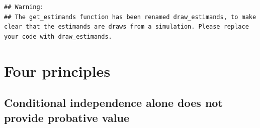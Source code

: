 \documentclass[12pt,]{book}
\newenvironment{Shaded}{\begin{snugshade}}{\end{snugshade}}
\newcommand{\DataTypeTok}[1]{\textcolor[rgb]{0.13,0.29,0.53}{#1}}
\newcommand{\DecValTok}[1]{\textcolor[rgb]{0.00,0.00,0.81}{#1}}
\newcommand{\FloatTok}[1]{\textcolor[rgb]{0.00,0.00,0.81}{#1}}
\newcommand{\KeywordTok}[1]{\textcolor[rgb]{0.13,0.29,0.53}{\textbf{#1}}}
\newcommand{\NormalTok}[1]{#1}
\newcommand{\OperatorTok}[1]{\textcolor[rgb]{0.81,0.36,0.00}{\textbf{#1}}}
\newcommand{\StringTok}[1]{\textcolor[rgb]{0.31,0.60,0.02}{#1}}
\begin{document}
\begin{Shaded}
\end{Shaded}

\begin{verbatim}
## Warning: 
## The get_estimands function has been renamed draw_estimands, to make clear that the estimands are draws from a simulation. Please replace your code with draw_estimands.
\end{verbatim}

\hypertarget{four-principles}{%
\section{Four principles}\label{four-principles}}

\hypertarget{conditional-independence-alone-does-not-provide-probative-value}{%
\subsection{Conditional independence alone does not provide probative value}\label{conditional-independence-alone-does-not-provide-probative-value}}
\end{document}
